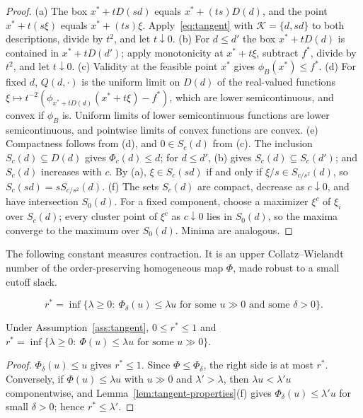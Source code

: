 \begin{proof}
(a) The box $x^*+tD(sd)$ equals $x^*+(ts)D(d)$, and the point $x^*+t(s\xi)$
equals $x^*+(ts)\xi$. Apply~\eqref{eq:tangent} with
$\mathcal K=\{d,sd\}$ to both descriptions, divide by $t^2$, and let
$t\downarrow0$. (b) For $d\le d'$ the box $x^*+tD(d)$ is contained in
$x^*+tD(d')$; apply monotonicity at $x^*+t\xi$, subtract $f^*$, divide by
$t^2$, and let $t\downarrow0$. (c) Validity at the feasible point $x^*$
gives $\phi_B(x^*)\le f^*$. (d) For fixed $d$, $Q(d,\cdot)$ is the uniform
limit on $D(d)$ of the real-valued functions
$\xi\mapsto t^{-2}(\phi_{x^*+tD(d)}(x^*+t\xi)-f^*)$, which are lower
semicontinuous, and convex if $\phi_B$ is. Uniform limits of lower
semicontinuous functions are lower semicontinuous, and pointwise limits
of convex functions are convex. (e) Compactness follows from (d), and
$0\in S_c(d)$ from (c). The inclusion $S_c(d)\subseteq D(d)$ gives
$\Phi_c(d)\le d$; for $d\le d'$, (b) gives $S_c(d)\subseteq S_c(d')$; and
$S_c(d)$ increases with $c$. By (a),
$\xi\in S_c(sd)$ if and only if $\xi/s\in S_{c/s^2}(d)$, so
$S_c(sd)=sS_{c/s^2}(d)$. (f) The sets $S_c(d)$ are compact, decrease as
$c\downarrow0$, and have intersection $S_0(d)$. For a fixed component,
choose a maximizer $\xi^c$ of $\xi_i$ over $S_c(d)$; every cluster point
of $\xi^c$ as $c\downarrow0$ lies in $S_0(d)$, so the maxima converge to the
maximum over $S_0(d)$. Minima are analogous.
\end{proof}

The following constant measures contraction. It is an upper
Collatz--Wielandt number of the order-preserving homogeneous map $\Phi$,
made robust to a small cutoff slack.

\begin{definition}
\[
  r^*=\inf\{\lambda\ge0:\ \Phi_\delta(u)\le\lambda u\text{ for some }u\gg0
  \text{ and some }\delta>0\}.
\]
\end{definition}

\begin{lemma}\label{lem:cw}
Under Assumption~\ref{ass:tangent}, $0\le r^*\le1$ and
$r^*=\inf\{\lambda\ge0:\ \Phi(u)\le\lambda u\text{ for some }u\gg0\}$.
\end{lemma}

\begin{proof}
$\Phi_\delta(u)\le u$ gives $r^*\le1$. Since $\Phi\le\Phi_\delta$, the right
side is at most $r^*$. Conversely, if $\Phi(u)\le\lambda u$ with $u\gg0$ and
$\lambda'>\lambda$, then $\lambda u<\lambda'u$ componentwise, and
Lemma~\ref{lem:tangent-properties}(f) gives $\Phi_\delta(u)\le\lambda'u$ for
small $\delta>0$; hence $r^*\le\lambda'$.
\end{proof}

